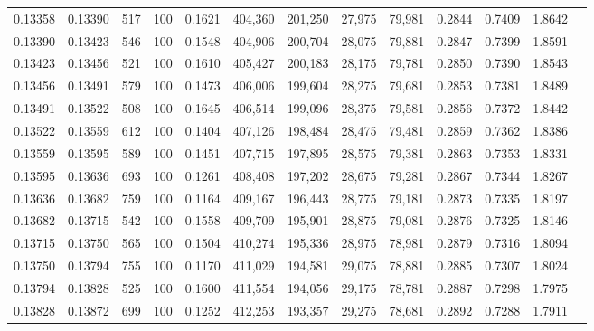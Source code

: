 \begin{tabular}{rrrrrrrrrrrrr}
0.13358 & 0.13390 &   517 & 100 &                                     0.1621 & 404,360 & 201,250 &  27,975 &  79,981 & 0.2844 & 0.7409 & 1.8642 \\
0.13390 & 0.13423 &   546 & 100 &                                     0.1548 & 404,906 & 200,704 &  28,075 &  79,881 & 0.2847 & 0.7399 & 1.8591 \\
0.13423 & 0.13456 &   521 & 100 &                                     0.1610 & 405,427 & 200,183 &  28,175 &  79,781 & 0.2850 & 0.7390 & 1.8543 \\
0.13456 & 0.13491 &   579 & 100 &                                     0.1473 & 406,006 & 199,604 &  28,275 &  79,681 & 0.2853 & 0.7381 & 1.8489 \\
0.13491 & 0.13522 &   508 & 100 &                                     0.1645 & 406,514 & 199,096 &  28,375 &  79,581 & 0.2856 & 0.7372 & 1.8442 \\
0.13522 & 0.13559 &   612 & 100 &                                     0.1404 & 407,126 & 198,484 &  28,475 &  79,481 & 0.2859 & 0.7362 & 1.8386 \\
0.13559 & 0.13595 &   589 & 100 &                                     0.1451 & 407,715 & 197,895 &  28,575 &  79,381 & 0.2863 & 0.7353 & 1.8331 \\
0.13595 & 0.13636 &   693 & 100 &                                     0.1261 & 408,408 & 197,202 &  28,675 &  79,281 & 0.2867 & 0.7344 & 1.8267 \\
0.13636 & 0.13682 &   759 & 100 &                                     0.1164 & 409,167 & 196,443 &  28,775 &  79,181 & 0.2873 & 0.7335 & 1.8197 \\
0.13682 & 0.13715 &   542 & 100 &                                     0.1558 & 409,709 & 195,901 &  28,875 &  79,081 & 0.2876 & 0.7325 & 1.8146 \\
0.13715 & 0.13750 &   565 & 100 &                                     0.1504 & 410,274 & 195,336 &  28,975 &  78,981 & 0.2879 & 0.7316 & 1.8094 \\
0.13750 & 0.13794 &   755 & 100 &                                     0.1170 & 411,029 & 194,581 &  29,075 &  78,881 & 0.2885 & 0.7307 & 1.8024 \\
0.13794 & 0.13828 &   525 & 100 &                                     0.1600 & 411,554 & 194,056 &  29,175 &  78,781 & 0.2887 & 0.7298 & 1.7975 \\
0.13828 & 0.13872 &   699 & 100 &                                     0.1252 & 412,253 & 193,357 &  29,275 &  78,681 & 0.2892 & 0.7288 & 1.7911 \\

\end{tabular}
